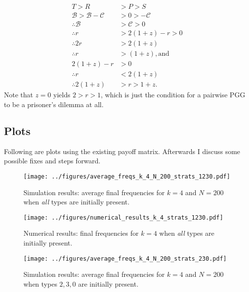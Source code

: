 \documentclass[13pt]{amsart}
\begin{document}
\begin{equation}
    \begin{split}
        T > R & > P > S \\
        \mathcal{B} > \mathcal{B} - \mathcal{C} & > 0 > -\mathcal{C} \\
        \therefore \mathcal{B} & > \mathcal{C} > 0 \\
        \therefore r & > 2(1 + z) - r > 0 \\
        \therefore 2r & > 2(1+z)\\
        \therefore r & > (1+z), \text{and}
        \\
        2(1+z) - r & > 0 \\
        \therefore r & < 2(1+z) \\
        \therefore 2(1+z) & > r > 1+z.
    \end{split}
\end{equation}
Note that $z = 0$ yields $2 > r > 1$, which is just the condition for a pairwise PGG to be a prisoner's dilemma at all.

\subsection*{Plots}

Following are plots using the existing payoff matrix.
Afterwards I discuss some possible fixes and steps forward.

\clearpage

\begin{figure}
    \texttt{[image: ../figures/average\_freqs\_k\_4\_N\_200\_strats\_1230.pdf]}
    \caption{Simulation results: average final frequencies for $k = 4$ and $N = 200$ when \emph{all} types are initially present.}
\end{figure}

\begin{figure}
    \texttt{[image: ../figures/numerical\_results\_k\_4\_strats\_1230.pdf]}
    \caption{Numerical results: final frequencies for $k = 4$ when \emph{all} types are initially present.}
\end{figure}

\begin{figure}
    \texttt{[image: ../figures/average\_freqs\_k\_4\_N\_200\_strats\_230.pdf]}
    \caption{Simulation results: average final frequencies for $k = 4$ and $N = 200$ when types $2, 3, 0$ are initially present.}
\end{figure}
\end{document}
